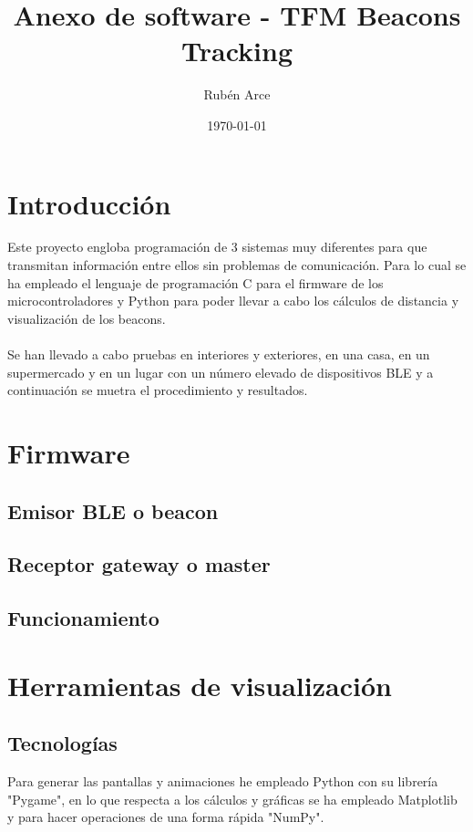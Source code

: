 \documentclass[a4paper ,12pt, onecolumn]{article}
\begin{document}
\pagestyle{fancy}
\title{Anexo de software - TFM Beacons Tracking}
\author{Rubén Arce}
\date{\today}
\maketitle
\cleardoublepage
\tableofcontents
\listoffigures
\cleardoublepage
\section{Introducción}
    Este proyecto engloba programación de 3 sistemas muy diferentes para que transmitan información entre ellos 
    sin problemas de comunicación. Para lo cual se ha empleado el lenguaje de programación C para el firmware de los 
    microcontroladores y Python para poder llevar a cabo los cálculos de distancia y visualización de los beacons.
    \paragraph{}
    Se han llevado a cabo pruebas en interiores y exteriores, en una casa, en un supermercado y en un lugar con un número elevado de dispositivos BLE y
    a continuación se muetra el procedimiento y resultados.
\section{Firmware}
    \subsection{Emisor BLE o beacon}
    \subsection{Receptor gateway o master}
        \subsection {Funcionamiento}
       
\section{Herramientas de visualización}
    \subsection{Tecnologías}
        Para generar las pantallas y animaciones he empleado Python con su librería "Pygame", en lo que respecta a los cálculos 
        y gráficas se ha empleado Matplotlib y para hacer operaciones de una forma rápida "NumPy".    
\end{document}
